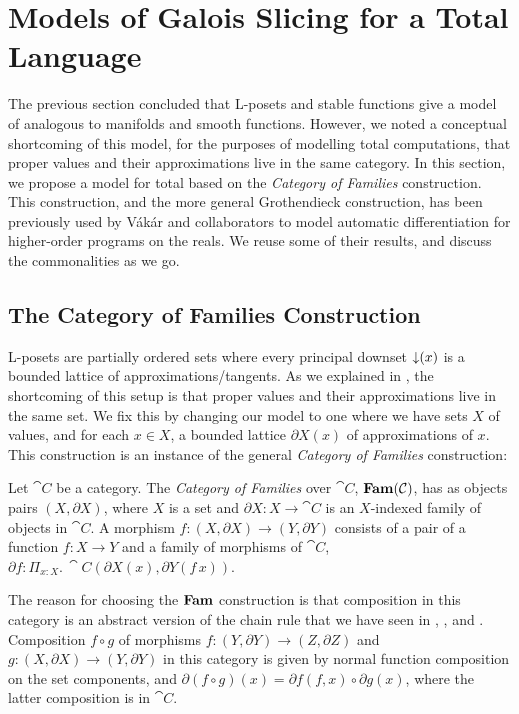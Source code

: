 \section{Models of Galois Slicing for a Total Language} %
\label{sec:models-of-total-gps}

The previous section concluded that L-posets and stable functions give
a model of \GPS analogous to manifolds and smooth functions. However,
we noted a conceptual shortcoming of this model, for the purposes of
modelling total computations, that proper values and their
approximations live in the same category. In this section, we propose
a model for total \GPS based on the \emph{Category of Families}
construction. This construction, and the more general Grothendieck
construction, has been previously used by V{\'a}k{\'a}r and
collaborators \cite{vakar22} to model automatic differentiation for
higher-order programs on the reals. We reuse some of their results,
and discuss the commonalities as we go.

\subsection{The Category of Families Construction}
\label{sec:models-of-total-gps:fam}

L-posets are partially ordered sets where every principal downset
$\mathop{\downarrow}(x)$ is a bounded lattice of approximations/tangents. As we
explained in , the shortcoming of this setup is that
proper values and their approximations live in the same set. We fix
this by changing our model to one where we have sets $X$ of values,
and for each $x \in X$, a bounded lattice $\partial X(x)$ of
approximations of $x$. This construction is an instance of the general
\emph{Category of Families} construction:

\begin{definition}
  Let $\cat{C}$ be a category. The \emph{Category of Families} over
  $\cat{C}$, $\mathbf{Fam}(\mathcal{C})$, has as objects pairs $(X, \partial X)$,
  where $X$ is a set and $\partial X : X \to \cat{C}$ is an
  $X$-indexed family of objects in $\cat{C}$. A morphism
  $f : (X, \partial X) \to (Y, \partial Y)$ consists of a pair of a
  function $f : X \to Y$ and a family of morphisms of $\cat{C}$,
  $\partial f : \Pi_{x : X}.\,\cat{C}(\partial X(x), \partial Y(f\,x))$.
\end{definition}

The reason for choosing the $\mathbf{Fam}$ construction is that composition in
this category is an abstract version of the chain rule that we have
seen in , , and
. Composition $f \circ g $ of morphisms
$f : (Y, \partial Y) \to (Z, \partial Z)$ and
$g : (X, \partial X) \to (Y, \partial Y)$ in this category is given by
normal function composition on the set components, and
$\partial (f \circ g)(x) = \partial f(f, x) \circ \partial g(x)$,
where the latter composition is in $\cat{C}$.

